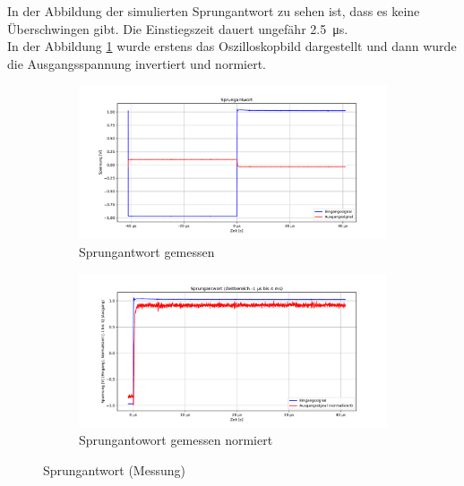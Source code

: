In der Abbildung der simulierten Sprungantwort zu sehen ist, dass es keine Überschwingen gibt. Die Einstiegszeit dauert ungefähr \SI{2,5}{\micro\second}.\\

In der Abbildung \ref{fig:Sprungantwort gemessen} wurde erstens das Oszilloskopbild dargestellt und dann wurde die Ausgangsspannung invertiert und normiert.

\begin{figure}[H]
  \begin{subfigure}{0.5\textwidth} %
    \centering
    \includegraphics[width=\linewidth]{Elektronik-Laborprotokoll_Filter/Plots/Sprungantwort gemessen.pdf}
    \caption{Sprungantwort gemessen}
  \end{subfigure}
  \begin{subfigure}{0.5\textwidth} %
    \centering
    \includegraphics[width=\linewidth]{Elektronik-Laborprotokoll_Filter/Plots/Sprungantwort_gemessen_normiert.pdf}
    \caption{Sprungantowort gemessen normiert}
  \end{subfigure}
 \caption{Sprungantwort (Messung) }
 \label{fig:Sprungantwort gemessen}
\end{figure}

